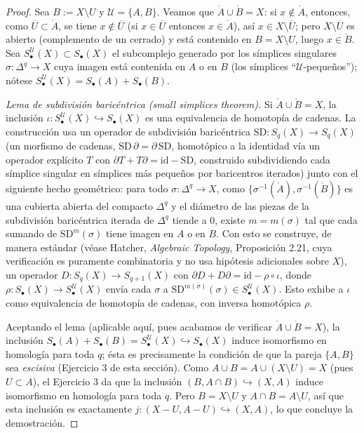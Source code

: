 \documentclass[11pt,a4paper]{article}
\theoremstyle{plain}
\theoremstyle{definition}
\theoremstyle{remark}
\begin{document}
\begin{proof}
Sea $B:=X\setminus U$ y $\mathcal U=\{A,B\}$. Veamos que
$\mathring A\cup\mathring B=X$: si $x\notin\mathring A$, entonces, como
$\overline U\subset\mathring A$, se tiene $x\notin\overline U$ (si
$x\in\overline U$ entonces $x\in\mathring A$), así
$x\in X\setminus\overline U$; pero $X\setminus\overline U$ es abierto
(complemento de un cerrado) y está contenido en $B=X\setminus U$, luego
$x\in\mathring B$. Sea $S_\bullet^{\mathcal U}(X)\subset S_\bullet(X)$ el
subcomplejo generado por los símplices singulares $\sigma:\Delta^q\to X$
cuya imagen está contenida en $A$ o en $B$ (los símplices
``$\mathcal U$-pequeños''); nótese
$S_\bullet^{\mathcal U}(X)=S_\bullet(A)+S_\bullet(B)$.

\emph{Lema de subdivisión baricéntrica (small simplices theorem).} Si
$\mathring A\cup\mathring B=X$, la inclusión
$\iota:S_\bullet^{\mathcal U}(X)\hookrightarrow S_\bullet(X)$ es una
equivalencia de homotopía de cadenas. La construcción usa un operador de
subdivisión baricéntrica $\mathrm{SD}:S_q(X)\to S_q(X)$ (un morfismo de
cadenas, $\mathrm{SD}\,\partial=\partial\,\mathrm{SD}$, homotópico a la
identidad vía un operador explícito $T$ con
$\partial T+T\partial=\mathrm{id}-\mathrm{SD}$, construido subdividiendo
cada símplice singular en símplices más pequeños por baricentros
iterados) junto con el siguiente hecho geométrico: para todo
$\sigma:\Delta^q\to X$, como $\{\sigma^{-1}(\mathring A),\sigma^{-1}(\mathring B)\}$
es una cubierta abierta del compacto $\Delta^q$ y el diámetro de las
piezas de la subdivisión baricéntrica iterada de $\Delta^q$ tiende a $0$,
existe $m=m(\sigma)$ tal que cada sumando de $\mathrm{SD}^m(\sigma)$ tiene
imagen en $A$ o en $B$. Con esto se construye, de manera estándar (véase
Hatcher, \emph{Algebraic Topology}, Proposición 2.21, cuya verificación
es puramente combinatoria y no usa hipótesis adicionales sobre $X$), un
operador $D:S_q(X)\to S_{q+1}(X)$ con
$\partial D+D\partial=\mathrm{id}-\rho\circ\iota$, donde
$\rho:S_\bullet(X)\to S_\bullet^{\mathcal U}(X)$ envía cada $\sigma$ a
$\mathrm{SD}^{m(\sigma)}(\sigma)\in S_\bullet^{\mathcal U}(X)$. Esto
exhibe a $\iota$ como equivalencia de homotopía de cadenas, con inversa
homotópica $\rho$.

Aceptando el lema (aplicable aquí, pues acabamos de verificar
$\mathring A\cup\mathring B=X$), la inclusión
$S_\bullet(A)+S_\bullet(B)=S_\bullet^{\mathcal U}(X)\hookrightarrow S_\bullet(X)$
induce isomorfismo en homología para toda $q$; ésta es precisamente la
condición de que la pareja $\{A,B\}$ sea \emph{escisiva} (Ejercicio 3 de
esta sección). Como $A\cup B=A\cup(X\setminus U)=X$ (pues $U\subset A$),
el Ejercicio 3 da que la inclusión $(B,A\cap B)\hookrightarrow(X,A)$
induce isomorfismo en homología para toda $q$. Pero $B=X\setminus U$ y
$A\cap B=A\setminus U$, así que esta inclusión es exactamente
$j:(X-U,A-U)\hookrightarrow(X,A)$, lo que concluye la demostración.
\end{proof}
\end{document}
